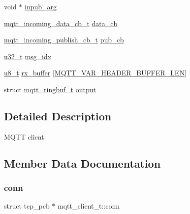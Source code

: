 \begin{DoxyCompactItemize}
\item 
void $\ast$ \hyperlink{structmqtt__client__t_a0bf99bf60c31c84f32f618394a569fc1}{inpub\+\_\+arg}
\item 
\hyperlink{group__mqtt_gafec7e75fe6a746eef9ca411463446c81}{mqtt\+\_\+incoming\+\_\+data\+\_\+cb\+\_\+t} \hyperlink{structmqtt__client__t_a3dc93a43df32d297cc5ab677c2d7fcb0}{data\+\_\+cb}
\item 
\hyperlink{group__mqtt_ga7116bb85255394cec4b1d9fa38842c29}{mqtt\+\_\+incoming\+\_\+publish\+\_\+cb\+\_\+t} \hyperlink{structmqtt__client__t_afb1500ccfda7f232274c97c717901331}{pub\+\_\+cb}
\item 
\hyperlink{group__compiler__abstraction_ga4c14294869aceba3ef9d4c0c302d0f33}{u32\+\_\+t} \hyperlink{structmqtt__client__t_a88fdc82ad31ecb15e4adaeb5363c3ca1}{msg\+\_\+idx}
\item 
\hyperlink{group__compiler__abstraction_ga4caecabca98b43919dd11be1c0d4cd8e}{u8\+\_\+t} \hyperlink{structmqtt__client__t_ae09f1a0f2d78fcbe0ce1ad9139847192}{rx\+\_\+buffer} \mbox{[}\hyperlink{group__mqtt__opts_ga8275ef78a85fb14c3ac1423c70e45805}{M\+Q\+T\+T\+\_\+\+V\+A\+R\+\_\+\+H\+E\+A\+D\+E\+R\+\_\+\+B\+U\+F\+F\+E\+R\+\_\+\+L\+EN}\mbox{]}
\item 
struct \hyperlink{structmqtt__ringbuf__t}{mqtt\+\_\+ringbuf\+\_\+t} \hyperlink{structmqtt__client__t_a99a47e18b78a99284ec7a568172093e2}{output}
\end{DoxyCompactItemize}


\subsection{Detailed Description}
M\+Q\+TT client 

\subsection{Member Data Documentation}
\mbox{\label{structmqtt__client__t_a1533a9954f57379bd378866ee0f01198}} 
\subsubsection{\texorpdfstring{conn}{conn}}
{\footnotesize\ttfamily struct tcp\+\_\+pcb $\ast$ mqtt\+\_\+client\+\_\+t\+::conn}

\mbox{\label{structmqtt__client__t_a5823d082e96704fd7f6dac15cbeceb3b}} 
